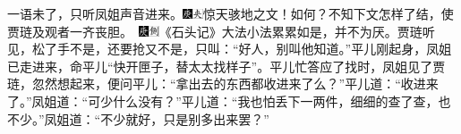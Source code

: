 {一语未了，只听凤姐声音进来。{\includegraphics[width=3mm]{../Images/00004}\includegraphics[width=3mm]{../Images/00012}\footnotesize \kaishu 惊天骇地之文！如何？不知下文怎样了结，使贾琏及观者一齐丧胆。　{\includegraphics[width=3mm]{../Images/00004}\includegraphics[width=3mm]{../Images/00011}\footnotesize \kaishu 《石头记》大法小法累累如是，并不为厌。}}贾琏听见，松了手不是，还要抢又不是，只叫：``好人，别叫他知道。''平儿刚起身，凤姐已走进来，命平儿``快开匣子，替太太找样子''。平儿忙答应了找时，凤姐见了贾琏，忽然想起来，便问平儿：``拿出去的东西都收进来了么？''平儿道：``收进来了。''凤姐道：``可少什么没有？''平儿道：``我也怕丢下一两件，细细的查了查，也不少。''凤姐道：``不少就好，只是别多出来罢？''{{
}}}

